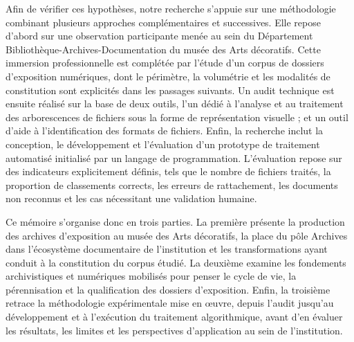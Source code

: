  Afin de vérifier ces hypothèses, notre recherche s’appuie sur une méthodologie combinant plusieurs approches complémentaires et successives. Elle repose d’abord sur une observation participante menée au sein du Département Bibliothèque-Archives-Documentation du musée des Arts décoratifs. Cette immersion professionnelle est complétée par l’étude d’un corpus de dossiers d’exposition numériques, dont le périmètre, la volumétrie et les modalités de constitution sont explicités dans les passages suivants. Un audit technique est ensuite réalisé sur la base de deux outils, l'un dédié à l'analyse et au traitement des arborescences de fichiers sous la forme de représentation visuelle ; et un outil d’aide à l’identification des formats de fichiers. Enfin, la recherche inclut la conception, le développement et l’évaluation d’un prototype de traitement automatisé initialisé par un langage de programmation. L’évaluation repose sur des indicateurs explicitement définis, tels que le nombre de fichiers traités, la proportion de classements corrects, les erreurs de rattachement, les documents non reconnus et les cas nécessitant une validation humaine.
 
 Ce mémoire s’organise donc en trois parties. La première présente la production des archives d’exposition au musée des Arts décoratifs, la place du pôle Archives dans l’écosystème documentaire de l’institution et les transformations ayant conduit à la constitution du corpus étudié. La deuxième examine les fondements archivistiques et numériques mobilisés pour penser le cycle de vie, la pérennisation et la qualification des dossiers d’exposition. Enfin, la troisième retrace la méthodologie expérimentale mise en œuvre, depuis l’audit jusqu’au développement et à l’exécution du traitement algorithmique, avant d’en évaluer les résultats, les limites et les perspectives d’application au sein de l’institution.
 
 
 
 




